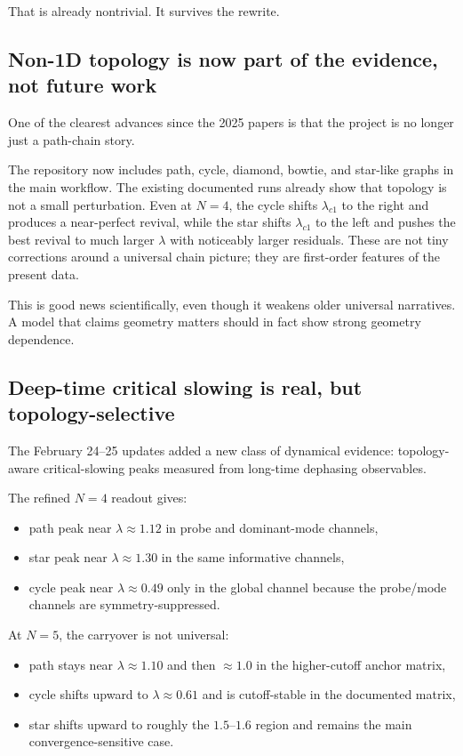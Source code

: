 \documentclass[11pt]{article}
\begin{document}
That is already nontrivial. It survives the rewrite.

\subsection{Non-1D topology is now part of the evidence, not future work}

One of the clearest advances since the 2025 papers is that the project is no longer just a path-chain story.

The repository now includes path, cycle, diamond, bowtie, and star-like graphs in the main workflow. The existing documented runs already show that topology is not a small perturbation. Even at $N=4$, the cycle shifts $\lambda_{c1}$ to the right and produces a near-perfect revival, while the star shifts $\lambda_{c1}$ to the left and pushes the best revival to much larger $\lambda$ with noticeably larger residuals. These are not tiny corrections around a universal chain picture; they are first-order features of the present data.

This is good news scientifically, even though it weakens older universal narratives. A model that claims geometry matters should in fact show strong geometry dependence.

\subsection{Deep-time critical slowing is real, but topology-selective}

The February 24--25 updates added a new class of dynamical evidence: topology-aware critical-slowing peaks measured from long-time dephasing observables.

The refined $N=4$ readout gives:
\begin{itemize}
    \item path peak near $\lambda \approx 1.12$ in probe and dominant-mode channels,
    \item star peak near $\lambda \approx 1.30$ in the same informative channels,
    \item cycle peak near $\lambda \approx 0.49$ only in the global channel because the probe/mode channels are symmetry-suppressed.
\end{itemize}

At $N=5$, the carryover is not universal:
\begin{itemize}
    \item path stays near $\lambda \approx 1.10$ and then $\approx 1.0$ in the higher-cutoff anchor matrix,
    \item cycle shifts upward to $\lambda \approx 0.61$ and is cutoff-stable in the documented matrix,
    \item star shifts upward to roughly the $1.5$--$1.6$ region and remains the main convergence-sensitive case.
\end{itemize}
\end{document}

